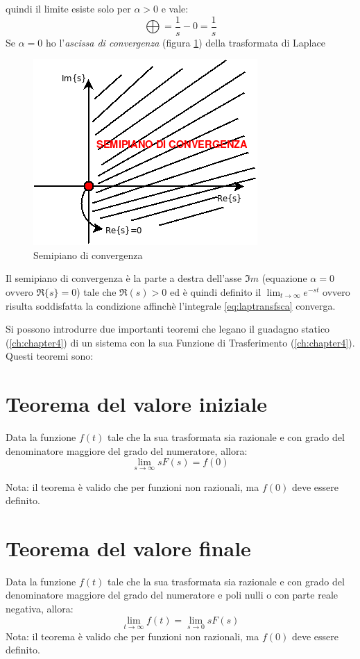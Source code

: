 \documentclass[a4paper]{report}
\begin{document}
quindi il limite esiste solo per $\alpha >0$ e vale:
\begin{displaymath}
  \bigoplus = \frac{1}{s}-0 = \frac{1}{s}
\end{displaymath}
Se $\alpha = 0$ ho l'\emph{ascissa di convergenza} (figura
\ref{fig:fig5}) della trasformata di Laplace
\begin{figure}[!hbp]
  \begin{center}
    \includegraphics[scale=0.5]{./figures/semipconv.png}
    \caption{Semipiano di convergenza}\label{fig:fig5}
  \end{center}
\end{figure} 
Il semipiano di convergenza \`e la parte a destra dell'asse $\Im m$
(equazione $\alpha=0$ ovvero $\Re\{s\}=0$) tale che $\Re(s)>0$ ed \`e
quindi definito il $\lim_{t \to \infty}e^{-st}$ ovvero risulta
soddisfatta la condizione affinch\`e l'integrale \ref{eq:laptransfsca}
converga.

Si possono introdurre  due importanti teoremi che legano il
guadagno statico (\ref{ch:chapter4}) di un sistema con la sua Funzione
di Trasferimento (\ref{ch:chapter4}). Questi teoremi sono:

\section{Teorema del valore iniziale}
Data la funzione $f(t)$ tale che la sua trasformata sia razionale e
con grado del denominatore maggiore del grado del numeratore, allora:
\begin{equation}
  \lim_{s \to \infty} sF(s)=f(0)
\end{equation}

Nota: il teorema \`e valido che per funzioni non razionali, ma $f(0)$
deve essere definito.

\section{Teorema del valore finale}\label{teoremaValoreFinale}
Data la funzione $f(t)$ tale che la sua trasformata sia razionale e
con grado del denominatore maggiore del grado del numeratore e poli
nulli o con parte reale negativa, allora:
\begin{equation}
  \lim_{t \to \infty} f(t)=\lim_{s \to 0} s F(s)
\end{equation}
Nota: il teorema \`e valido che per funzioni non razionali, ma $f(0)$
deve essere definito.
\end{document}
